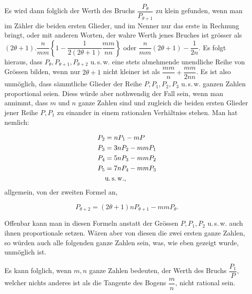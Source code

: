 
Es wird dann folglich der Werth des Bruchs $\dfrac{P_\theta}{P_{\theta+1}}$ zu klein
gefunden, wenn man im Zähler die beiden ersten Glieder, und im Nenner nur das erste in
Rechnung bringt, oder mit anderen Worten, der wahre Werth jenes Bruches ist grösser als
$(2\theta+1) . \dfrac{n}{mm}\left\{1-\dfrac{1}{2(2\theta+1)}\dfrac{mm}{nn}\right\}$ oder
$\dfrac{n}{mm}(2\theta+1)-\dfrac{1}{2n}$. 
Es folgt hieraus, dass $P_\theta, P_{\theta+1}, P_{\theta+2}$ u.\,s.\,w. eine stets
abnehmende unendliche Reihe von Grössen bilden, wenn nur $2\theta+1$ nicht kleiner ist als
$\dfrac{mm}{n}+\dfrac{mm}{2nn}$. Es ist also unmöglich, dass sämmtliche Glieder der Reihe
$P, P_1, P_2, P_3$ u.\,s.\,w. ganzen Zahlen proportional seien. Diess würde aber
nothwendig der Fall sein, wenn man annimmt, dass $m$ und $n$ ganze Zahlen sind und
zugleich die beiden ersten Glieder jener Reihe $P, P_1$ zu einander in einem rationalen
Verhältniss stehen. Man hat nemlich:

\[
\begin{aligned}
P_2 &= nP_1 - mP\\
P_3 &= 3nP_2 - mmP_1\\
P_4 &= 5nP_3 - mmP_2\\
P_5 &= 7nP_4 - mmP_3\\
&\text{u.\,s.\,w.,}
\end{aligned}
\]
\noindent allgemein, von der zweiten Formel an,

\[
P_{\theta+2} = (2\theta+1)nP_{\theta+1} - mmP_\theta.
\]

Offenbar kann man in diesen Formeln anstatt der Grössen $P, P_1, P_2$ u.\,s.\,w. auch
ihnen proportionale setzen. Wären aber von diesen die zwei ersten ganze Zahlen, so würden
auch alle folgenden ganze Zahlen sein, was, wie eben gezeigt wurde, unmöglich ist.

Es kann folglich, wenn $m, n$ ganze Zahlen bedeuten, der Werth des Bruchs
$\dfrac{P_1}{P}$, welcher nichts anderes ist als die Tangente des Bogens
$\dfrac{m}{n}$, nicht rational sein.
